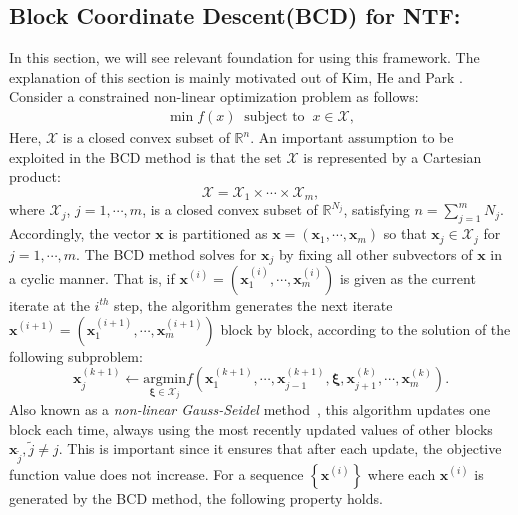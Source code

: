 \subsection {Block Coordinate Descent(BCD) for NTF:}

In this section, we will see relevant foundation for using  this
framework.  The explanation of this section is mainly motivated out of
Kim, He and Park \cite{KHP2014}. Consider a constrained non-linear optimization problem
as follows:
\begin{gather}
\min f(x)\:\mbox{ subject to }\:x \in\mathcal{X},\label{eq:general_nonlinear}
\end{gather}
Here,  $\mathcal{X}$ is a closed convex subset of $\mathbb{R}^{n}$.
An important assumption to be exploited in the BCD method is that
the set $\mathcal{X}$ is represented by a Cartesian product:
\begin{equation}
\mathcal{X}=\mathcal{X}_{1}\times\cdots\times\mathcal{X}_{m},\label{eq:bcd-cartesian-product}
\end{equation}
where $\mathcal{X}_{j}$, $j=1,\cdots,m$, is a closed convex subset
of $\mathbb{R}^{N_{j}}$, satisfying $n=\sum_{j=1}^{m}N_{j}$.
Accordingly, the vector $\mathbf{x}$ is partitioned as
$\mathbf{x}=(\mathbf{x}_{1},\cdots,\mathbf{x}_{m})$ so that
$\mathbf{x}_{j}\in\mathcal{X}_{j}$ for $j=1,\cdots,m$. The BCD
method solves for $\mathbf{x}_{j}$ by fixing all other subvectors of
$\mathbf{x}$ in a cyclic manner. That is, if
$\mathbf{x}^{(i)}=(\mathbf{x}_{1}^{(i)},\cdots,\mathbf{x}_{m}^{(i)})$
is given as the current iterate at the $i^{th}$ step, the algorithm
generates the next iterate
$\mathbf{x}^{(i+1)}=(\mathbf{x}_{1}^{(i+1)},\cdots,\mathbf{x}_{m}^{(i+1)})$
block by block, according to the solution of the following
subproblem:
\begin{equation}
\mathbf{x}_{j}^{(k+1)}\leftarrow\underset{\mathbf{\xi}\in\mathcal{X}_{j}}{\text{argmin}}
f(\mathbf{x}_{1}^{(k+1)},\cdots,\mathbf{x}_{j-1}^{(k+1)},\mathbf{\xi},\mathbf{x}_{j+1}^{(k)},\cdots,\mathbf{x}_{m}^{(k)}).\label{eq:bcd-method}
\end{equation}
Also known as a \textit{non-linear Gauss-Seidel}
method~\cite{Bertsekas1999}, this algorithm updates one block each
time, always using the most recently updated values of other blocks
$\mathbf{x}_{\tilde{j}},\tilde{j}\ne j$. This is important since it
ensures that after each update, the objective function value does
not increase. For a sequence $\left\lbrace
\mathbf{x}^{(i)}\right\rbrace $ where each $\mathbf{x}^{(i)}$ is
generated by the BCD method, the following property holds.

